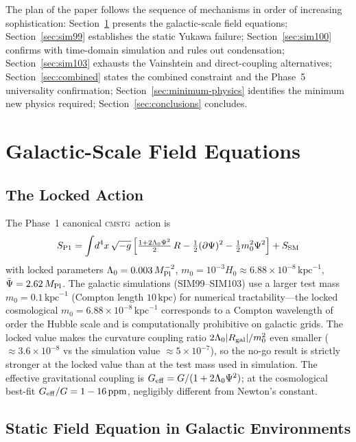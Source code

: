 \documentclass[12pt,a4paper]{article}
\newcommand{\CMSTG}{\textsc{cmstg}}
\newcommand{\Lz}{\Lambda_0}
\newcommand{\Mpl}{M_{\rm Pl}}
\newcommand{\Geff}{G_{\rm eff}}
\theoremstyle{plain}
\begin{document}
The plan of the paper follows the sequence of mechanisms in order of
increasing sophistication: Section~\ref{sec:setup} presents the galactic-scale
field equations; Section~\ref{sec:sim99} establishes the static Yukawa failure;
Section~\ref{sec:sim100} confirms with time-domain simulation and rules out
condensation; Section~\ref{sec:sim103} exhausts the Vainshtein and direct-coupling
alternatives; Section~\ref{sec:combined} states the combined constraint and the
Phase~5 universality confirmation; Section~\ref{sec:minimum-physics} identifies
the minimum new physics required; Section~\ref{sec:conclusions} concludes.

\section{Galactic-Scale Field Equations}
\label{sec:setup}

\subsection{The Locked Action}
\label{sec:locked}

The Phase~1 canonical \CMSTG\ action is
\begin{equation}
  S_{\rm P1} = \int\!d^4x\,\sqrt{-g}\,\Bigl[
    \tfrac{1+2\Lz\Psi^2}{2}\,R
    - \tfrac{1}{2}(\partial\Psi)^2
    - \tfrac{1}{2}m_0^2\Psi^2
  \Bigr] + S_{\rm SM}
  \label{eq:action}
\end{equation}
with locked parameters $\Lz = 0.003\,\Mpl^{-2}$, $m_0 = 10^{-3}H_0
\approx 6.88\times10^{-8}\,\mathrm{kpc}^{-1}$, $\bar\Psi = 2.62\,\Mpl$.
The galactic simulations (SIM99--SIM103) use a larger test mass
$m_0 = 0.1\,\mathrm{kpc}^{-1}$ (Compton length $10\,\mathrm{kpc}$) for
numerical tractability---the locked cosmological
$m_0 = 6.88\times10^{-8}\,\mathrm{kpc}^{-1}$ corresponds to a Compton
wavelength of order the Hubble scale and is computationally prohibitive on
galactic grids. The locked value makes the curvature coupling ratio
$2\Lz|R_{\rm gal}|/m_0^2$ even smaller ($\approx 3.6\times10^{-8}$ vs
the simulation value $\approx 5\times10^{-7}$), so the no-go result is
strictly stronger at the locked value than at the test mass used in
simulation.
The effective gravitational coupling is $\Geff = G/(1 + 2\Lz\Psi^2)$;
at the cosmological best-fit $\Geff/G = 1 - 16\,\mathrm{ppm}$, negligibly
different from Newton's constant.

\subsection{Static Field Equation in Galactic Environments}
\end{document}

